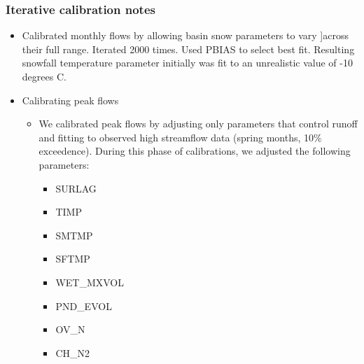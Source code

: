 \subsubsection{Iterative calibration notes}
\begin{itemize}
    \item Calibrated monthly flows by allowing basin snow parameters to vary
    ]across their full range. Iterated 2000 times. Used PBIAS to select best
    fit.
    Resulting snowfall temperature parameter initially was fit to an unrealistic
    value of -10 degrees C.
    \item Calibrating peak flows
    \begin{itemize}
        \item We calibrated peak flows by adjusting only parameters that control
        runoff and fitting to observed high streamflow data (spring months,
        10\% exceedence).
        During this phase of calibrations, we adjusted the following parameters:
        \begin{itemize}
            \item SURLAG
            \item TIMP
            \item SMTMP
            \item SFTMP
            \item WET\_MXVOL
            \item PND\_EVOL
            \item OV\_N
            \item CH\_N2


\end{itemize}
\end{itemize}
\end{itemize}
